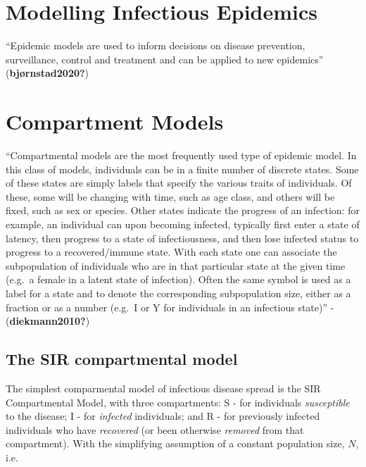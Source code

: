 \documentclass[
  letterpaper,
  DIV=11,
  numbers=noendperiod]{scrreprt}
\begin{document}
\hypertarget{modelling-infectious-epidemics}{%
\section{Modelling Infectious
Epidemics}\label{modelling-infectious-epidemics}}

``Epidemic models are used to inform decisions on disease prevention,
surveillance, control and treatment and can be applied to new
epidemics'' (\textbf{bjørnstad2020?})

\hypertarget{compartment-models}{%
\section{Compartment Models}\label{compartment-models}}

``Compartmental models are the most frequently used type of epidemic
model. In this class of models, individuals can be in a finite number of
discrete states. Some of these states are simply labels that specify the
various traits of individuals. Of these, some will be changing with
time, such as age class, and others will be fixed, such as sex or
species. Other states indicate the progress of an infection: for
example, an individual can upon becoming infected, typically first enter
a state of latency, then progress to a state of infectiousness, and then
lose infected status to progress to a recovered/immune state. With each
state one can associate the subpopulation of individuals who are in that
particular state at the given time (e.g.~a female in a latent state of
infection). Often the same symbol is used as a label for a state and to
denote the corresponding subpopulation size, either as a fraction or as
a number (e.g.~I or Y for individuals in an infectious state)'' -
(\textbf{diekmann2010?})

\hypertarget{the-sir-compartmental-model}{%
\subsection{The SIR compartmental
model}\label{the-sir-compartmental-model}}

The simplest comparmental model of infectious disease spread is the SIR
Compartmental Model, with three compartments: S - for individuals
\emph{susceptible} to the disease; I - for \emph{infected} individuals;
and R - for previously infected individuals who have \emph{recovered}
(or been otherwise \emph{removed} from that compartment). With the
simplifying assumption of a constant population size, \(N\), i.e.
\end{document}
